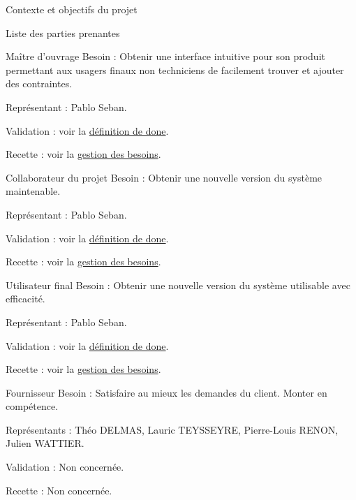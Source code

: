 \documentclass[]{article}
\begin{document}
{\begin{section}{\label{sec:Contexte et objectifs du projet}Contexte et objectifs du projet}
\begin{subsection}{\label{sec:Liste des parties prenantes}Liste des parties prenantes}
         \begin{subsubsection}{\label{sec:Maître d’ouvrage}Maître d’ouvrage}
             Besoin : Obtenir une interface intuitive pour son produit permettant aux usagers finaux non techniciens de facilement trouver et ajouter des contraintes.

             Représentant : Pablo Seban.

             Validation : voir la \hyperref[sec:Définition de done]{définition de done}.

             Recette : voir la \hyperref[sec:Gestion des besoins]{gestion des besoins}.
         \end{subsubsection}

         \begin{subsubsection}{\label{sec:Collaborateur du projet}Collaborateur du projet}
             Besoin : Obtenir une nouvelle version du système maintenable.

             Représentant : Pablo Seban.

             Validation : voir la \hyperref[sec:Définition de done]{définition de done}.

             Recette : voir la \hyperref[sec:Gestion des besoins]{gestion des besoins}.
         \end{subsubsection}

         \begin{subsubsection}{\label{sec:Utilisateur final}Utilisateur final}
             Besoin : Obtenir une nouvelle version du système utilisable avec efficacité.

             Représentant : Pablo Seban.

             Validation : voir la \hyperref[sec:Définition de done]{définition de done}.

             Recette : voir la \hyperref[sec:Gestion des besoins]{gestion des besoins}.
         \end{subsubsection}

         \begin{subsubsection}{\label{sec:Fournisseur}Fournisseur}
             Besoin : Satisfaire au mieux les demandes du client.
             Monter en compétence.

             Représentants : Théo DELMAS, Lauric TEYSSEYRE, Pierre-Louis RENON, Julien WATTIER.

             Validation : Non concernée.

             Recette : Non concernée.
         \end{subsubsection}


\end{subsection}
\end{section}}
\end{document}
